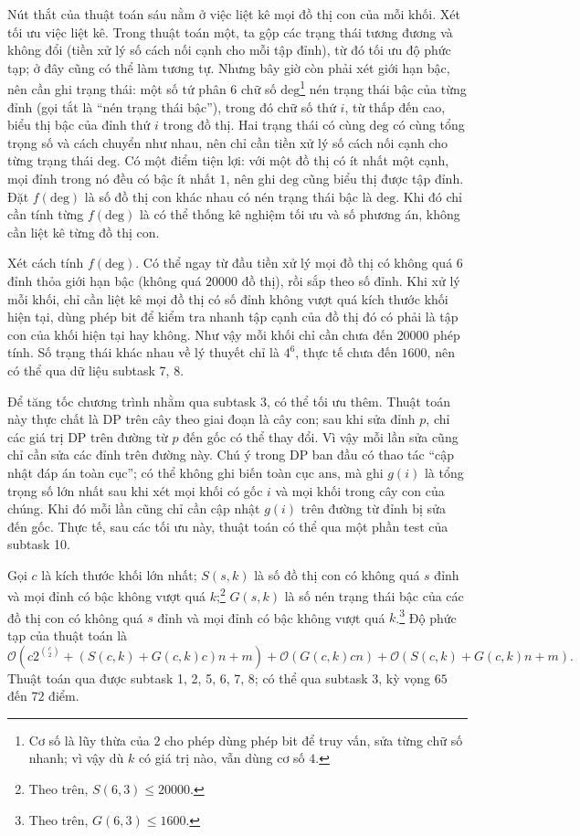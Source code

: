 \documentclass[11pt]{article}
\newcommand{\Oh}{\mathcal{O}}
\begin{document}
Nút thắt của thuật toán sáu nằm ở việc liệt kê mọi đồ thị con của mỗi khối.
Xét tối ưu việc liệt kê. Trong thuật toán một, ta gộp các trạng thái tương
đương và không đổi (tiền xử lý số cách nối cạnh cho mỗi tập đỉnh), từ đó tối
ưu độ phức tạp; ở đây cũng có thể làm tương tự. Nhưng bây giờ còn phải xét
giới hạn bậc, nên cần ghi trạng thái: một số tứ phân \(6\) chữ số
\(\mathrm{deg}\)\footnote{Cơ số là lũy thừa của \(2\) cho phép dùng phép bit
để truy vấn, sửa từng chữ số nhanh; vì vậy dù \(k\) có giá trị nào, vẫn dùng
cơ số \(4\).} nén trạng thái bậc của từng đỉnh (gọi tắt là ``nén trạng thái
bậc''), trong đó chữ số thứ \(i\), từ thấp đến cao, biểu thị bậc của đỉnh thứ
\(i\) trong đồ thị. Hai trạng thái có cùng \(\mathrm{deg}\) có cùng tổng trọng
số và cách chuyển như nhau, nên chỉ cần tiền xử lý số cách nối cạnh cho từng
trạng thái \(\mathrm{deg}\). Có một điểm tiện lợi: với một đồ thị có ít nhất
một cạnh, mọi đỉnh trong nó đều có bậc ít nhất \(1\), nên ghi
\(\mathrm{deg}\) cũng biểu thị được tập đỉnh. Đặt \(f(\mathrm{deg})\) là số đồ
thị con khác nhau có nén trạng thái bậc là \(\mathrm{deg}\). Khi đó chỉ cần
tính từng \(f(\mathrm{deg})\) là có thể thống kê nghiệm tối ưu và số phương án,
không cần liệt kê từng đồ thị con.

Xét cách tính \(f(\mathrm{deg})\). Có thể ngay từ đầu tiền xử lý mọi đồ thị có
không quá \(6\) đỉnh thỏa giới hạn bậc (không quá \(20000\) đồ thị), rồi sắp
theo số đỉnh. Khi xử lý mỗi khối, chỉ cần liệt kê mọi đồ thị có số đỉnh không
vượt quá kích thước khối hiện tại, dùng phép bit để kiểm tra nhanh tập cạnh
của đồ thị đó có phải là tập con của khối hiện tại hay không. Như vậy mỗi khối
chỉ cần chưa đến \(20000\) phép tính. Số trạng thái khác nhau về lý thuyết chỉ
là \(4^6\), thực tế chưa đến \(1600\), nên có thể qua dữ liệu subtask 7, 8.

Để tăng tốc chương trình nhằm qua subtask 3, có thể tối ưu thêm. Thuật toán
này thực chất là DP trên cây theo giai đoạn là cây con; sau khi sửa đỉnh \(p\),
chỉ các giá trị DP trên đường từ \(p\) đến gốc có thể thay đổi. Vì vậy mỗi lần
sửa cũng chỉ cần sửa các đỉnh trên đường này. Chú ý trong DP ban đầu có thao
tác ``cập nhật đáp án toàn cục''; có thể không ghi biến toàn cục
\(\mathrm{ans}\), mà ghi \(g(i)\) là tổng trọng số lớn nhất sau khi xét mọi
khối có gốc \(i\) và mọi khối trong cây con của chúng. Khi đó mỗi lần cũng chỉ
cần cập nhật \(g(i)\) trên đường từ đỉnh bị sửa đến gốc. Thực tế, sau các tối
ưu này, thuật toán có thể qua một phần test của subtask 10.

Gọi \(c\) là kích thước khối lớn nhất; \(S(s,k)\) là số đồ thị con có không quá
\(s\) đỉnh và mọi đỉnh có bậc không vượt quá \(k\);\footnote{Theo trên,
\(S(6,3)\le 20000\).} \(G(s,k)\) là số nén trạng thái bậc của các đồ thị con
có không quá \(s\) đỉnh và mọi đỉnh có bậc không vượt quá \(k\).\footnote{Theo
trên, \(G(6,3)\le 1600\).} Độ phức tạp của thuật toán là
\[
  \Oh\!\left(c2^{\binom{c}{2}}+(S(c,k)+G(c,k)c)n+m\right)
  +\Oh(G(c,k)cn)
  +\Oh(S(c,k)+G(c,k)n+m).
\]
Thuật toán qua được subtask 1, 2, 5, 6, 7, 8; có thể qua subtask 3, kỳ vọng
\(65\) đến \(72\) điểm.
\end{document}
